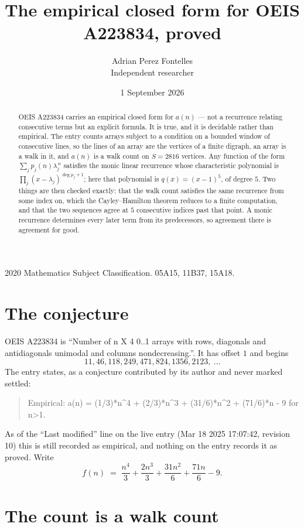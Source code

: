 \documentclass[11pt,a4paper]{article}
\title{The empirical closed form for OEIS A223834, proved}
\author{Adrian Perez Fontelles\\ \small Independent researcher}
\date{1 September 2026}
\theoremstyle{plain}
\theoremstyle{definition}
\begin{document}
\maketitle

\begin{abstract}
OEIS A223834 carries an empirical closed form for $a(n)$ --- not a recurrence relating
consecutive terms but an explicit formula. It is true, and it is decidable rather than
empirical. The entry counts arrays subject to a condition on a bounded window of consecutive lines, so the lines of an array are the
vertices of a finite digraph, an array is a walk in it, and $a(n)$ is a walk count on
$S=2816$ vertices. Any function of the form $\sum_j p_j(n)\lambda_j^{\,n}$ satisfies the
monic linear recurrence whose characteristic polynomial is
$\prod_j(x-\lambda_j)^{\deg p_j+1}$; here that polynomial is $q(x)=(x-1)^{5}$, of degree
$5$. Two things are then checked exactly: that the walk count satisfies the same
recurrence from some index on, which the Cayley--Hamilton theorem reduces to a finite
computation, and that the two sequences agree at $5$ consecutive indices past that
point. A monic recurrence determines every later term from its predecessors, so agreement
there is agreement for good.
\end{abstract}

\noindent\small 2020 Mathematics Subject Classification. 05A15, 11B37, 15A18.\normalsize

\section{The conjecture}

OEIS A223834 is ``Number of n X 4 0..1 arrays with rows, diagonals and antidiagonals unimodal and columns nondecreasing.''. It has offset $1$ and begins
\[
11, 46, 118, 249, 471, 824, 1356, 2123,\ \dots
\]
The entry states, as a conjecture contributed by its author and never marked settled:
\begin{quote}
Empirical: a(n) = (1/3)*n\^{}4 + (2/3)*n\^{}3 + (31/6)*n\^{}2 + (71/6)*n - 9 for n>1.
\end{quote}
As of the ``Last modified'' line on the live entry (Mar 18 2025 17:07:42, revision 10) this is still
recorded as empirical, and nothing on the entry records it as proved. Write
\[
f(n)\;=\;\frac{n^{4}}{3} + \frac{2 n^{3}}{3} + \frac{31 n^{2}}{6} + \frac{71 n}{6} - 9.
\]

\section{The count is a walk count}
\end{document}
